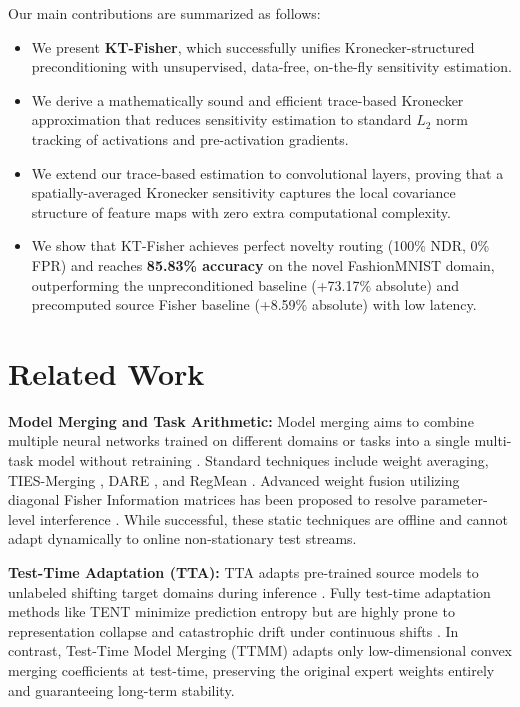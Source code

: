 \documentclass{article}
\theoremstyle{plain}
\theoremstyle{definition}
\theoremstyle{remark}
\begin{document}
Our main contributions are summarized as follows:
\begin{itemize}
    \item We present \textbf{KT-Fisher}, which successfully unifies Kronecker-structured preconditioning with unsupervised, data-free, on-the-fly sensitivity estimation.
    \item We derive a mathematically sound and efficient trace-based Kronecker approximation that reduces sensitivity estimation to standard $L_2$ norm tracking of activations and pre-activation gradients.
    \item We extend our trace-based estimation to convolutional layers, proving that a spatially-averaged Kronecker sensitivity captures the local covariance structure of feature maps with zero extra computational complexity.
    \item We show that KT-Fisher achieves perfect novelty routing (100\% NDR, 0\% FPR) and reaches \textbf{85.83\% accuracy} on the novel FashionMNIST domain, outperforming the unpreconditioned baseline (+73.17\% absolute) and precomputed source Fisher baseline (+8.59\% absolute) with low latency.
\end{itemize}

\section{Related Work}
\label{related-work}
\textbf{Model Merging and Task Arithmetic:} Model merging aims to combine multiple neural networks trained on different domains or tasks into a single multi-task model without retraining \cite{wortsman2022model, ainsworth2023git}. Standard techniques include weight averaging, TIES-Merging \cite{yadav2023ties}, DARE \cite{yu2023dare}, and RegMean \cite{jin2023regmean}. Advanced weight fusion utilizing diagonal Fisher Information matrices has been proposed to resolve parameter-level interference \cite{matena2022merging}. While successful, these static techniques are offline and cannot adapt dynamically to online non-stationary test streams.

\textbf{Test-Time Adaptation (TTA):} TTA adapts pre-trained source models to unlabeled shifting target domains during inference \cite{wang2021tent, boudiaf2022parameter}. Fully test-time adaptation methods like TENT minimize prediction entropy but are highly prone to representation collapse and catastrophic drift under continuous shifts \cite{zhao2023catastrophic, schneider2020improving}. In contrast, Test-Time Model Merging (TTMM) adapts only low-dimensional convex merging coefficients at test-time, preserving the original expert weights entirely and guaranteeing long-term stability.
\end{document}
